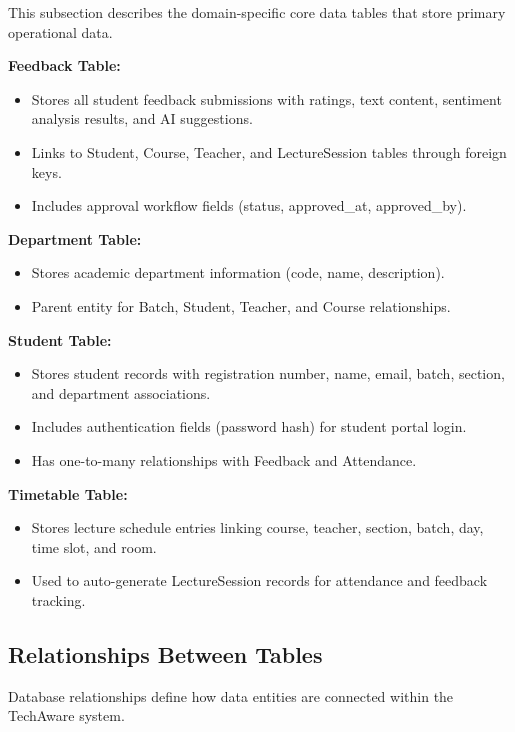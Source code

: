 This subsection describes the domain-specific core data tables that store primary operational data.

\textbf{Feedback Table:}
\begin{itemize}
    \item Stores all student feedback submissions with ratings, text content, sentiment analysis results, and AI suggestions.
    \item Links to Student, Course, Teacher, and LectureSession tables through foreign keys.
    \item Includes approval workflow fields (status, approved\_at, approved\_by).
\end{itemize}

\textbf{Department Table:}
\begin{itemize}
    \item Stores academic department information (code, name, description).
    \item Parent entity for Batch, Student, Teacher, and Course relationships.
\end{itemize}

\textbf{Student Table:}
\begin{itemize}
    \item Stores student records with registration number, name, email, batch, section, and department associations.
    \item Includes authentication fields (password hash) for student portal login.
    \item Has one-to-many relationships with Feedback and Attendance.
\end{itemize}

\textbf{Timetable Table:}
\begin{itemize}
    \item Stores lecture schedule entries linking course, teacher, section, batch, day, time slot, and room.
    \item Used to auto-generate LectureSession records for attendance and feedback tracking.
\end{itemize}



\subsection{Relationships Between Tables}

Database relationships define how data entities are connected within the TechAware system.

